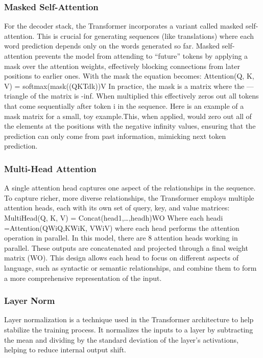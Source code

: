 \subsubsection{Masked Self-Attention}
For the decoder stack, the Transformer incorporates a variant called masked self-attention. This is crucial for generating sequences (like translations) where each word prediction depends only on the words generated so far. Masked self-attention prevents the model from attending to “future” tokens by applying a mask over the attention weights, effectively blocking connections from later positions to earlier ones. With the mask the equation becomes: 
	Attention(Q, K, V) = softmax(mask((QKTdk))V
In practice, the mask is a matrix where the — triangle of the matrix is -inf. When multiplied this effectively zeros out all tokens that come sequentially after token i in the sequence. Here is an example of a mask matrix for a small, toy example.This, when applied, would zero out all of the elements at the positions with the negative infinity values, ensuring that the prediction can only come from past information, mimicking next token prediction. 

\subsubsection{Multi-Head Attention}
A single attention head captures one aspect of the relationships in the sequence. To capture richer, more diverse relationships, the Transformer employs multiple attention heads, each with its own set of query, key, and value matrices:
	MultiHead(Q, K, V) = Concat(head1,…,headh)WO 
	Where each headi =Attention(QWiQ,KWiK, VWiV)  
where each head performs the attention operation in parallel. In this model, there are 8 attention heads working in parallel. These outputs are concatenated and projected through a final weight matrix (WO). This design allows each head to focus on different aspects of language, such as syntactic or semantic relationships, and combine them to form a more comprehensive representation of the input.

\subsubsection{Layer Norm}
Layer normalization is a technique used in the Transformer architecture to help stabilize the training process. It normalizes the inputs to a layer by subtracting the mean and dividing by the standard deviation of the layer's activations, helping to reduce internal output shift.

